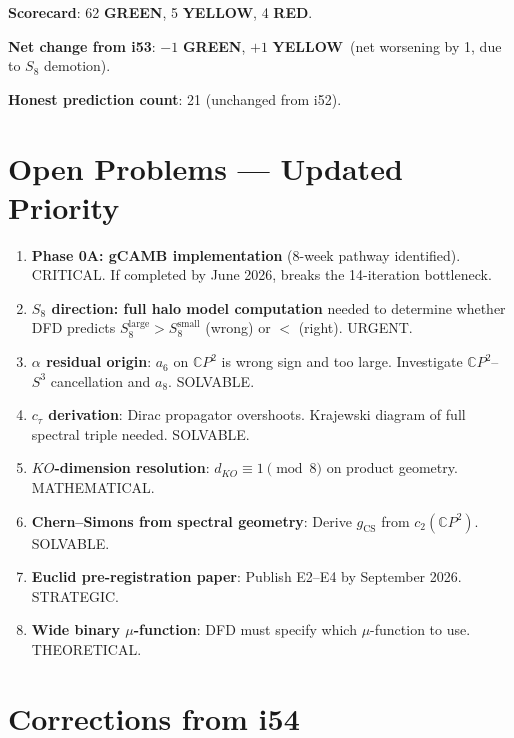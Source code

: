\documentclass[11pt,a4paper]{article}
\newcommand{\GREEN}{\textcolor{dfdgreen}{\textbf{GREEN}}}
\newcommand{\YELLOW}{\textcolor{dfdyellow}{\textbf{YELLOW}}}
\newcommand{\RED}{\textcolor{dfdred}{\textbf{RED}}}
\newcommand{\CP}{\mathbb{C}P}
\begin{document}
\textbf{Scorecard}: 62 \GREEN, 5 \YELLOW, 4 \RED.

\textbf{Net change from i53}: $-1$ \GREEN, $+1$ \YELLOW\ (net worsening by 1, due to $S_8$ demotion).

\textbf{Honest prediction count}: 21 (unchanged from i52).


\section{Open Problems --- Updated Priority}
\label{sec:open}

\begin{enumerate}[label=\textbf{P\arabic*.}]
\item \textbf{Phase 0A: gCAMB implementation} (8-week pathway identified). CRITICAL. If completed by June 2026, breaks the 14-iteration bottleneck.
\item \textbf{$S_8$ direction: full halo model computation} needed to determine whether DFD predicts $S_8^{\mathrm{large}} > S_8^{\mathrm{small}}$ (wrong) or $<$ (right). URGENT.
\item \textbf{$\alpha$ residual origin}: $a_6$ on $\CP^2$ is wrong sign and too large. Investigate $\CP^2$--$S^3$ cancellation and $a_8$. SOLVABLE.
\item \textbf{$c_\tau$ derivation}: Dirac propagator overshoots. Krajewski diagram of full spectral triple needed. SOLVABLE.
\item \textbf{$KO$-dimension resolution}: $d_{KO} \equiv 1 \pmod{8}$ on product geometry. MATHEMATICAL.
\item \textbf{Chern--Simons from spectral geometry}: Derive $g_{\mathrm{CS}}$ from $c_2(\CP^2)$. SOLVABLE.
\item \textbf{Euclid pre-registration paper}: Publish E2--E4 by September 2026. STRATEGIC.
\item \textbf{Wide binary $\mu$-function}: DFD must specify which $\mu$-function to use. THEORETICAL.
\end{enumerate}


\section{Corrections from i54}
\label{sec:corrections}
\end{document}
